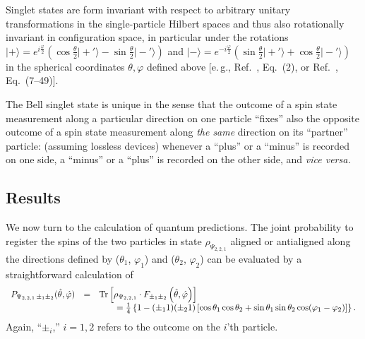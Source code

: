 \documentclass[pra,amsfonts,showpacs,showkeys,preprint]{revtex4}
\begin{document}
Singlet states are form invariant with respect to arbitrary unitary
transformations in the single-particle Hilbert spaces and thus
also rotationally invariant in configuration space,
in particular under the rotations
$
\vert + \rangle =
e^{ i{\frac{\varphi}{2}} }
\left(
\cos \frac{\theta}{2} \vert +'  \rangle
-
\sin \frac{\theta}{2} \vert -'   \rangle
\right)
$
and
$
\vert - \rangle =
e^{ -i{\frac{\varphi}{2}} }
\left(
\sin \frac{\theta}{2} \vert +'   \rangle
+
\cos \frac{\theta}{2} \vert -'  \rangle
\right)
$
in the spherical coordinates $\theta , \varphi$ defined above
[e.\,g., Ref.~\cite{krenn1}, Eq.~(2), or Ref.~\cite{ba-89}, Eq.~(7--49)].

The Bell singlet state is unique in the sense that the outcome of a spin state measurement
along a particular direction on one particle ``fixes'' also the opposite outcome of a spin state measurement
along {\em the same} direction on its ``partner'' particle: (assuming lossless devices)
whenever a ``plus'' or a ``minus'' is recorded on one side,
a ``minus'' or a ``plus'' is recorded on the other side, and {\it vice versa.}




\subsection{Results}

We now turn to the calculation of quantum predictions.
The joint probability to register the spins of the two particles
in state $\rho_{\Psi_{2,2,1}}$
aligned or antialigned along the directions defined by
($\theta_1$, $\varphi_1 $) and
($\theta_2$, $\varphi_2 $)
can be evaluated by a straightforward calculation of
\begin{equation}
\begin{array}{rcl}
P_{{ \Psi_{2,2,1}}\,\pm_1 \pm_2 } ({\hat \theta},{\hat \varphi} )&=&
{\rm Tr}\left[\rho_{ \Psi_{2,2,1}} \cdot F_{\pm_1 \pm_2 } \left({\hat \theta},{\hat \varphi} \right)\right] \\
&&\qquad
=\frac{1}{4} \left\{ 1-(\pm_1 1)( \pm_2 1) \left[\cos \theta_1 \cos \theta_2 + \sin \theta_1 \sin \theta_2 \cos (\varphi_1-\varphi_2) \right]\right\}
.
\end{array}
\end{equation}
Again, ``$\pm_i$,'' $i=1,2$ refers to the outcome on the $i$'th particle.
\end{document}
